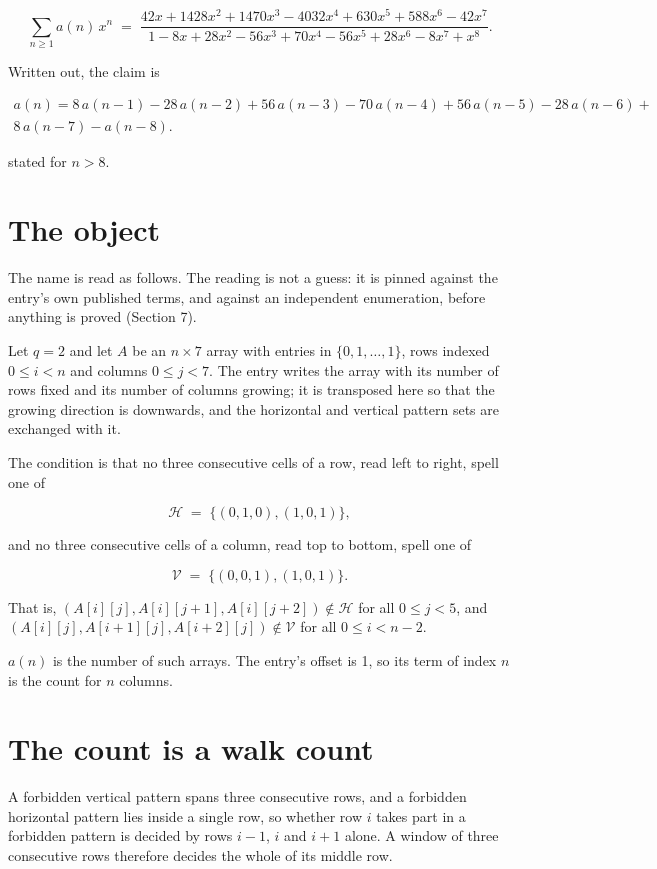 \documentclass[11pt]{article}
\theoremstyle{definition}
\begin{document}
\[\sum_{n \ge 1} a(n)\,x^n \;=\; \frac{42x + 1428x^{2} + 1470x^{3} - 4032x^{4} + 630x^{5} + 588x^{6} - 42x^{7}}{1 - 8x + 28x^{2} - 56x^{3} + 70x^{4} - 56x^{5} + 28x^{6} - 8x^{7} + x^{8}}.\]

Written out, the claim is

\begin{multline*} a(n) = 8\,a(n-1) - 28\,a(n-2) + 56\,a(n-3) - 70\,a(n-4) + 56\,a(n-5) - 28\,a(n-6) + \\ 8\,a(n-7) - a(n-8). \end{multline*}

stated for $n > 8$.

\section{The object}

The name is read as follows. The reading is not a guess: it is pinned against the entry's own published terms, and against an independent enumeration, before anything is proved (Section 7).

Let $q = 2$ and let $A$ be an $n \times 7$ array with entries in $\{0,1,\dots,1\}$, rows indexed $0 \le i < n$ and columns $0 \le j < 7$. The entry writes the array with its number of rows fixed and its number of columns growing; it is transposed here so that the growing direction is downwards, and the horizontal and vertical pattern sets are exchanged with it.

The condition is that no three consecutive cells of a row, read left to right, spell one of

\[\mathcal{H} \;=\; \{(0,1,0), (1,0,1)\},\]

and no three consecutive cells of a column, read top to bottom, spell one of

\[\mathcal{V} \;=\; \{(0,0,1), (1,0,1)\}.\]

That is, $(A[i][j],A[i][j{+}1],A[i][j{+}2]) \notin \mathcal{H}$ for all $0 \le j < 5$, and $(A[i][j],A[i{+}1][j],A[i{+}2][j]) \notin \mathcal{V}$ for all $0 \le i < n-2$.

$a(n)$ is the number of such arrays. The entry's offset is 1, so its term of index $n$ is the count for $n$ columns.

\section{The count is a walk count}

A forbidden vertical pattern spans three consecutive rows, and a forbidden horizontal pattern lies inside a single row, so whether row $i$ takes part in a forbidden pattern is decided by rows $i-1$, $i$ and $i+1$ alone. A window of three consecutive rows therefore decides the whole of its middle row.
\end{document}
